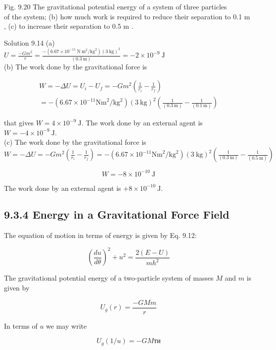 \documentclass[10pt]{article}
\begin{document}
Fig. 9.20 The gravitational potential energy of a system of three particles\\
of the system; (b) how much work is required to reduce their separation to 0.1 m , (c) to increase their separation to 0.5 m .

Solution 9.14 (a)\\
$U=\frac{-G m^{2}}{r}=\frac{-\left(6.67 \times 10^{-11} \mathrm{~N} \mathrm{~m}^{2} / \mathrm{kg}^{2}\right)(3 \mathrm{~kg})^{2}}{(0.3 \mathrm{~m})}=-2 \times 10^{-9} \mathrm{~J}$\\
(b) The work done by the gravitational force is

$$
\begin{gathered}
W=-\Delta U=U_{i}-U_{f}=-G m^{2}\left(\frac{1}{r_{i}}-\frac{1}{r_{f}}\right) \\
=-\left(6.67 \times 10^{-11} \mathrm{Nm}^{2} / \mathrm{kg}^{2}\right)(3 \mathrm{~kg})^{2}\left(\frac{1}{(0.3 \mathrm{~m})}-\frac{1}{(0.1 \mathrm{~m})}\right)
\end{gathered}
$$

that gives $W=4 \times 10^{-9} \mathrm{~J}$. The work done by an external agent is $W=-4 \times 10^{-9} \mathrm{~J}$.\\
(c) The work done by the gravitational force is\\
$W=-\Delta U=-G m^{2}\left(\frac{1}{r_{i}}-\frac{1}{r_{f}}\right)=-\left(6.67 \times 10^{-11} \mathrm{Nm}^{2} / \mathrm{kg}^{2}\right)(3 \mathrm{~kg})^{2}\left(\frac{1}{(0.3 \mathrm{~m})}-\frac{1}{(0.5 \mathrm{~m})}\right)$

$$
W=-8 \times 10^{-10} \mathrm{~J}
$$

The work done by an external agent is $+8 \times 10^{-10} \mathrm{~J}$.

\subsection*{9.3.4 Energy in a Gravitational Force Field}
The equation of motion in terms of energy is given by Eq. 9.12:

$$
\left(\frac{d u}{d \theta}\right)^{2}+u^{2}=\frac{2(E-U)}{m h^{2}}
$$

The gravitational potential energy of a two-particle system of masses $M$ and $m$ is given by

$$
U_{g}(r)=\frac{-G M m}{r}
$$

In terms of $u$ we may write


\begin{equation*}
U_{g}(1 / u)=-G M т и \tag{9.28}
\end{equation*}
\end{document}

